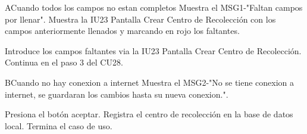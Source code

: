 \begin{UCtrayectoriaA}{A}{Cuando todos los campos no estan completos}
	\UCpaso Muestra el MSG1-"Faltan campos por llenar".
	\UCpaso Muestra la IU23 Pantalla Crear Centro de Recolección con los campos anteriormente llenados y marcando en rojo los faltantes.
	\item\UCactor Introduce los campos faltantes via la IU23 Pantalla Crear Centro de Recolección.
	\UCpaso Continua en el paso 3 del CU28.
\end{UCtrayectoriaA}

\begin{UCtrayectoriaA}{B}{Cuando no hay conexion a internet}
	\UCpaso Muestra el MSG2-"No se tiene conexion a internet, se guardaran los cambios hasta su nueva conexion.".
	\item\UCactor Presiona el botón aceptar.
	\UCpaso Registra el centro de recolección en la base de datos local.	
	\UCpaso[] Termina el caso de uso.
\end{UCtrayectoriaA}
